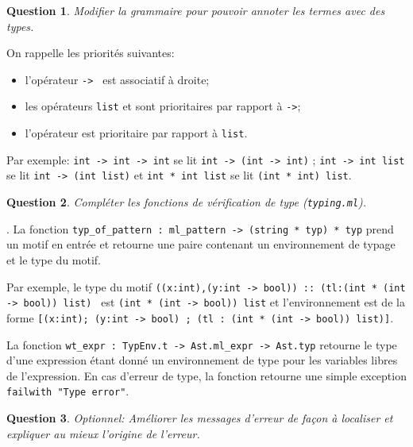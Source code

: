 \documentclass{article}
\newtheorem{question}{Question}[section]
\newcommand{\Question}[1]{\begin{question}#1\end{question}}
\begin{document}
\Question{Modifier la grammaire pour pouvoir annoter les termes avec des types.}
On rappelle les priorités suivantes:
\begin{itemize}
\item l'opérateur {\tt -> } est associatif à droite;
\item les opérateurs {\tt list} et {\tt *} sont prioritaires par rapport à {\tt ->};
\item l'opérateur {\tt *} est prioritaire par rapport à {\tt list}.
\end{itemize}
Par exemple: {\tt int -> int -> int} se lit {\tt int -> (int -> int)} ; {\tt int -> int list} se lit {\tt int -> (int list)} et {\tt int * int list} se lit {\tt (int * int) list}.

\Question{Compléter les fonctions de vérification de type ({\tt typing.ml}).}.
La fonction {\tt typ\_of\_pattern : ml\_pattern -> (string * typ) * typ} prend un motif en entrée et retourne une paire contenant un environnement de
typage et le type du motif.

Par exemple, le type du motif {\tt ((x:int),(y:int -> bool)) :: (tl:(int * (int -> bool)) list) } est {\tt (int * (int -> bool)) list} et
l'environnement est de la forme {\tt [(x:int); (y:int -> bool) ; (tl : (int * (int -> bool)) list)]}.

La fonction {\tt wt\_expr : TypEnv.t -> Ast.ml\_expr -> Ast.typ} retourne le type d'une expression
étant donné un environnement de type pour les variables libres de l'expression.
%
En cas d'erreur de type, la fonction retourne une simple exception {\tt failwith "Type error"}.

\Question{Optionnel: Améliorer les messages d'erreur de façon à localiser et expliquer au mieux l'origine de l'erreur.}
\end{document}
